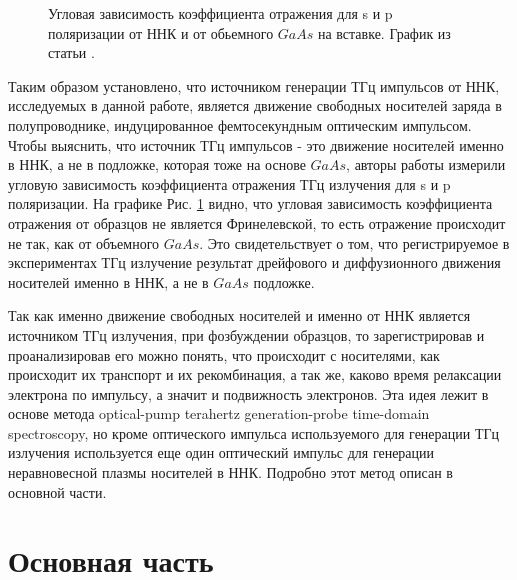 \documentclass[a4paper,14pt,russian]{extreport}
\begin{document}
				\begin{figure}[h]
					\caption{Угловая зависимость коэффициента отражения для s и p поляризации от ННК и от обьемного $GaAs$ на вставке. График из статьи \cite{THzGeneration}.}
				\label{ris:ReflectiveNNW}
				\end{figure}
				Таким образом установлено, что источником генерации ТГц импульсов от ННК, исследуемых в данной работе, является движение свободных носителей заряда в полупроводнике, индуцированное фемтосекундным оптическим импульсом. Чтобы выяснить, что источник ТГц импульсов - это движение носителей именно в ННК, а не в подложке, которая тоже на основе $GaAs$, авторы работы измерили угловую зависимость коэффициента отражения ТГц излучения для s и p поляризации. На графике Рис. \ref{ris:ReflectiveNNW} видно, что угловая зависимость коэффициента отражения от образцов не является Фринелевской, то есть отражение происходит не так, как от объемного $GaAs$. Это свидетельствует о том, что регистрируемое в экспериментах ТГц излучение результат дрейфового и диффузионного движения носителей именно в ННК, а не в $GaAs$ подложке.\par
				Так как именно движение свободных носителей и именно от ННК является источником ТГц излучения, при фозбуждении образцов, то зарегистрировав и проанализировав его можно понять, что происходит с носителями, как происходит их транспорт и их рекомбинация, а так же, каково время релаксации электрона по импульсу, а значит и подвижность электронов. Эта идея лежит в основе метода optical-pump terahertz generation-probe time-domain spectroscopy, но кроме оптического импульса используемого для генерации ТГц излучения используется еще один оптический импульс для генерации неравновесной плазмы носителей в ННК. Подробно этот метод описан в основной части.
	\chapter{Основная часть}
\end{document}
